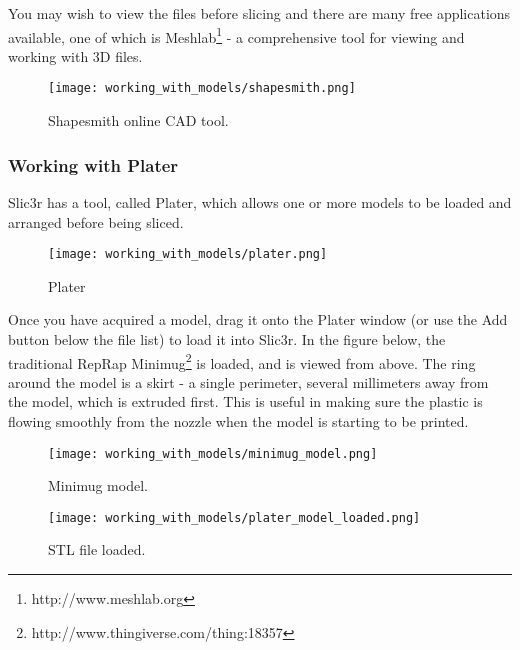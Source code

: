 You may wish to view the files before slicing and there are many free applications available, one of which is Meshlab\footnote{http://www.meshlab.org} - a comprehensive tool for viewing and working with 3D files.

\begin{figure}[H]
\centering
\texttt{[image: working\_with\_models/shapesmith.png]}
\caption{Shapesmith online CAD tool.}
\label{fig:shapesmith}
\end{figure}



\subsubsection{Working with Plater} %
\label{sub:working_with_plater}
Slic3r has a tool, called Plater, which allows one or more models to be loaded and arranged before being sliced.

\begin{figure}[H]
\centering
\texttt{[image: working\_with\_models/plater.png]}
\caption{Plater}
\label{fig:plater}
\end{figure}

Once you have acquired a model, drag it onto the Plater window (or use the Add button below the file list) to load it into Slic3r.  In the figure below, the traditional RepRap Minimug\footnote{http://www.thingiverse.com/thing:18357} is loaded, and is viewed from above. The ring around the model is a skirt - a single perimeter, several millimeters away from the model, which is extruded first.  This is useful in making sure the plastic is flowing smoothly from the nozzle when the model is starting to be printed.

\begin{figure}[H]
\centering
\texttt{[image: working\_with\_models/minimug\_model.png]}
\caption{Minimug model.}
\label{fig:minimug_model}
\end{figure}

\begin{figure}[H]
\centering
\texttt{[image: working\_with\_models/plater\_model\_loaded.png]}
\caption{STL file loaded.}
\label{fig:plater_model_loaded}
\end{figure}

